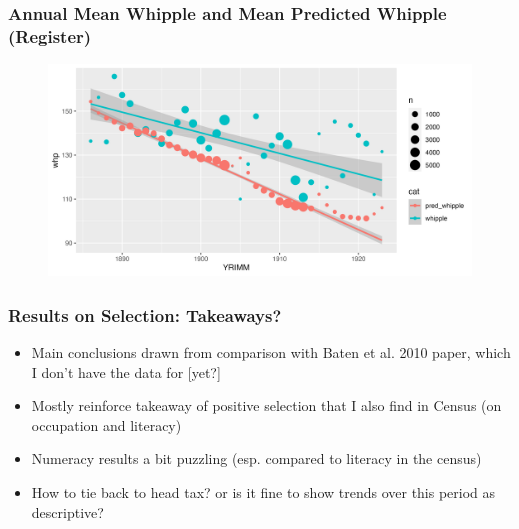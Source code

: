 \documentclass[xcolor=dvipsnames, compress, 12pt, aspectratio=169, handout]{beamer}
\begin{document}
\begin{frame}
    \frametitle{Annual Mean Whipple and Mean Predicted Whipple (Register)}
    \begin{figure}
        \centering
        \includegraphics[width=\textwidth]{../../figs/5oct23/whippleplot2.png}
    \end{figure}
\end{frame}

\begin{frame}
    \frametitle{Results on Selection: Takeaways?}
    \begin{itemize}
        \item Main conclusions drawn from comparison with Baten et al. 2010 paper, which I don't have the data for [yet?]
        \item Mostly reinforce takeaway of positive selection that I also find in Census (on occupation and literacy)
        \item Numeracy results a bit puzzling (esp. compared to literacy in the census)
        \item How to tie back to head tax? or is it fine to show trends over this period as descriptive?
    \end{itemize}
\end{frame}
\end{document}
